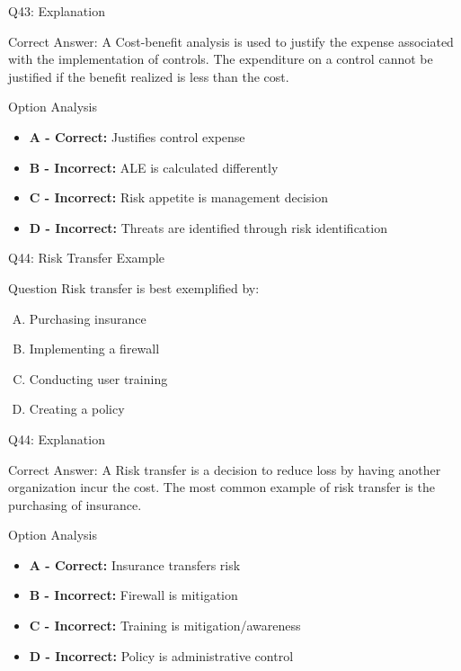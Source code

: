 \documentclass{beamer}
\begin{document}
	\begin{frame}{Q43: Explanation}
		\begin{block}{Correct Answer: A}
			Cost-benefit analysis is used to justify the expense associated with the implementation of controls. The expenditure on a control cannot be justified if the benefit realized is less than the cost.
		\end{block}
		\begin{block}{Option Analysis}
			\begin{itemize}
				\item \textbf{A - Correct:} Justifies control expense
				\item \textbf{B - Incorrect:} ALE is calculated differently
				\item \textbf{C - Incorrect:} Risk appetite is management decision
				\item \textbf{D - Incorrect:} Threats are identified through risk identification
			\end{itemize}
		\end{block}
	\end{frame}
	
	\begin{frame}{Q44: Risk Transfer Example}
		\begin{block}{Question}
			Risk transfer is best exemplified by:
		\end{block}
		\begin{enumerate}[(A)]
			\item Purchasing insurance
			\item Implementing a firewall
			\item Conducting user training
			\item Creating a policy
		\end{enumerate}
	\end{frame}
	
	\begin{frame}{Q44: Explanation}
		\begin{block}{Correct Answer: A}
			Risk transfer is a decision to reduce loss by having another organization incur the cost. The most common example of risk transfer is the purchasing of insurance.
		\end{block}
		\begin{block}{Option Analysis}
			\begin{itemize}
				\item \textbf{A - Correct:} Insurance transfers risk
				\item \textbf{B - Incorrect:} Firewall is mitigation
				\item \textbf{C - Incorrect:} Training is mitigation/awareness
				\item \textbf{D - Incorrect:} Policy is administrative control
			\end{itemize}
		\end{block}
	\end{frame}
	
\end{document}
